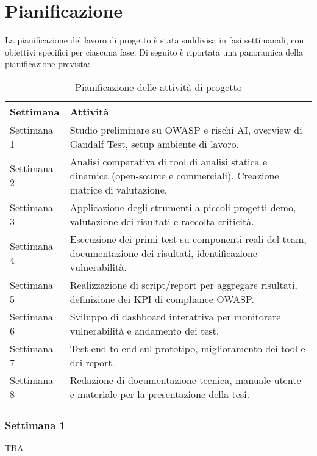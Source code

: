 \section{Pianificazione}

La pianificazione del lavoro di progetto è stata suddivisa in fasi settimanali, con obiettivi specifici per ciascuna fase. Di seguito è riportata una panoramica della pianificazione prevista:

\begin{table}[htbp]
    \centering
    \renewcommand{\arraystretch}{1.2}
    \begin{tabular}{|p{3cm}|p{10cm}|}
        \hline
        \textbf{Settimana} & \textbf{Attività} \\
        \hline
        Settimana 1 & Studio preliminare su OWASP e rischi AI, overview di Gandalf Test, setup ambiente di
lavoro.\\
        \hline
        Settimana 2 & Analisi comparativa di tool di analisi statica e dinamica (open-source e commerciali).
Creazione matrice di valutazione.\\
        \hline
        Settimana 3 & Applicazione degli strumenti a piccoli progetti demo, valutazione dei risultati e raccolta
criticità.\\
        \hline
        Settimana 4 & Esecuzione dei primi test su componenti reali del team, documentazione dei risultati,
identificazione vulnerabilità.\\
        \hline
        Settimana 5 & Realizzazione di script/report per aggregare risultati, definizione dei KPI di compliance
OWASP.\\
        \hline
        Settimana 6 & Sviluppo di dashboard interattiva per monitorare vulnerabilità e andamento dei test.\\
        \hline
        Settimana 7 & Test end-to-end sul prototipo, miglioramento dei tool e dei report.\newline\mbox{}\\
        \hline
        Settimana 8 & Redazione di documentazione tecnica, manuale utente e materiale per la presentazione
della tesi.\\
        \hline
    \end{tabular}
    \caption{Pianificazione delle attività di progetto}
\end{table}

\subsubsection{Settimana 1}
TBA
